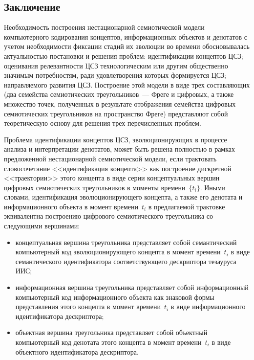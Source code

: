 \begin{multicols}{2}
\section{Заключение}

   Необходимость построения нестационарной семиотической модели компьютерного 
кодирования концептов, информационных объектов и денотатов с учетом необходимости 
фиксации стадий их эволюции во времени обосновывалась актуальностью постановки и 
решения проблем: идентификации концептов ЦСЗ; оценивания релевантности ЦСЗ 
технологическим или другим общественно значимым потребностям, ради удовлетворения 
которых формируется ЦСЗ; направляемого развития ЦСЗ. Построение этой модели в 
виде трех со\-став\-ля\-ющих (два семейства семиотических треугольников~--- Фреге и 
цифровых, а также множество точек, полученных в результате отображения семейства цифровых семиотических 
треугольников на пространство Фреге) представляют собой теоретическую основу для 
решения трех перечисленных проблем.
   
   Проблема идентификации концептов ЦСЗ, эволюционирующих в процессе анализа и 
интерпретации денотатов, может быть решена полностью в рамках предложенной 
нестационарной семиотической модели, если трактовать словосочетание <<идентификация 
концепта>> как построение дискретной <<траектории>> этого концепта в виде серии 
концептуальных вершин цифровых семиотических треугольников в моменты 
времени~$\{t_i\}$. Иными словами, идентификация эволюционирующего концепта, а также 
его денотата и информационного объекта в момент времени~$t_i$ в предлагаемой трактовке 
эквивалентна построению цифрового семиотического треугольника со следующими 
вер\-ши\-нами:
   \begin{itemize}
   \item концептуальная вершина треугольника представляет собой семантический компьютерный код 
эволюционирующего концепта в момент времени~$t_i$ в виде семантического идентификатора 
соответствующего дескриптора тезауруса ИИС;
\item информационная вершина треугольника представляет собой 
информационный компьютерный код информационного объекта как знаковой 
формы представления этого концепта в момент времени~$t_i$ в виде 
информационного идентификатора дескриптора;
\item объектная вершина треугольника представляет собой объектный 
компьютерный код денотата этого концепта в момент времени~$t_i$ в виде 
объектного идентификатора дескриптора.
\end{itemize}


\end{multicols}
